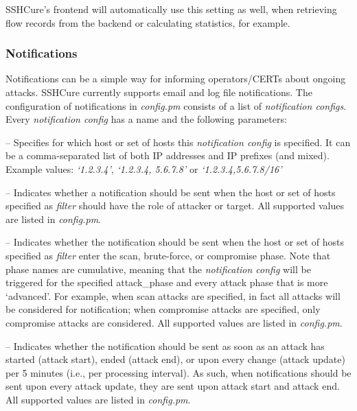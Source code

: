 SSHCure's frontend will automatically use this setting as well, when retrieving flow records from the backend or calculating statistics, for example.

\subsubsection{Notifications}

Notifications can be a simple way for informing operators/CERTs about ongoing attacks. SSHCure currently supports email and log file notifications. The configuration of notifications in \textit{config.pm} consists of a list of \textit{notification configs}. Every \textit{notification config} has a name  and the following parameters:

\begin{description}[font=\normalfont]
	\item [filter] -- Specifies for which host or set of hosts this \textit{notification config} is specified. It can be a comma-separated list of both IP addresses and IP prefixes (and mixed). Example values: \textit{`1.2.3.4'}, \textit{`1.2.3.4, 5.6.7.8'} or \textit{`1.2.3.4,5.6.7.8/16'}
	
	\item [filter\_type] -- Indicates whether a notification should be sent when the host or set of hosts specified as \textit{filter} should have the role of attacker or target. All supported values are listed in \textit{config.pm}.
	
	\item [attack\_phase] -- Indicates whether the notification should be sent when the host or set of hosts specified as \textit{filter} enter the scan, brute-force, or compromise phase. Note that phase names are cumulative, meaning that the \textit{notification config} will be triggered for the specified attack\_phase and every attack phase that is more `advanced'. For example, when scan attacks are specified, in fact all attacks will be considered for notification; when compromise attacks are specified, only compromise attacks are considered. All supported values are listed in \textit{config.pm}.
	
	\item [when] -- Indicates whether the notification should be sent as soon as an attack has started (attack start), ended (attack end), or upon every change (attack update) per 5 minutes (i.e., per processing interval). As such, when notifications should be sent upon every attack update, they are sent upon attack start and attack end. All supported values are listed in \textit{config.pm}.
	

\end{description}
